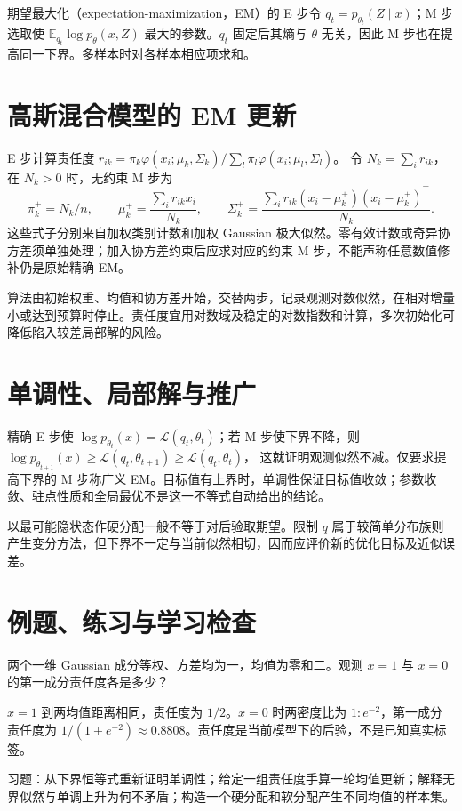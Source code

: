 期望最大化（expectation-maximization，EM）的 E 步令 $q_t=p_{\theta_t}(Z\mid x)$；M 步选取使 $\mathbb E_{q_t}\log p_\theta(x,Z)$ 最大的参数。$q_t$ 固定后其熵与 $\theta$ 无关，因此 M 步也在提高同一下界。多样本时对各样本相应项求和。

\section{高斯混合模型的 EM 更新}

E 步计算责任度
$r_{ik}=\pi_k\varphi(x_i;\mu_k,\Sigma_k)/\sum_l\pi_l\varphi(x_i;\mu_l,\Sigma_l)$。
令 $N_k=\sum_i r_{ik}$，在 $N_k>0$ 时，无约束 M 步为
\begin{equation}
 \pi_k^+=N_k/n,\qquad
 \mu_k^+=\frac{\sum_ir_{ik}x_i}{N_k},\qquad
 \Sigma_k^+=\frac{\sum_ir_{ik}(x_i-\mu_k^+)(x_i-\mu_k^+)^\top}{N_k}.
 \label{eq:ml-gmm-mstep}
\end{equation}
这些式子分别来自加权类别计数和加权 Gaussian 极大似然。零有效计数或奇异协方差须单独处理；加入协方差约束后应求对应的约束 M 步，不能声称任意数值修补仍是原始精确 EM。

算法由初始权重、均值和协方差开始，交替两步，记录观测对数似然，在相对增量小或达到预算时停止。责任度宜用对数域及稳定的对数指数和计算，多次初始化可降低陷入较差局部解的风险。

\section{单调性、局部解与推广}

精确 E 步使 $\log p_{\theta_t}(x)=\mathcal L(q_t,\theta_t)$；若 M 步使下界不降，则
$\log p_{\theta_{t+1}}(x)\geq\mathcal L(q_t,\theta_{t+1})\geq\mathcal L(q_t,\theta_t)$，
这就证明观测似然不减。仅要求提高下界的 M 步称广义 EM。目标值有上界时，单调性保证目标值收敛；参数收敛、驻点性质和全局最优不是这一不等式自动给出的结论。

以最可能隐状态作硬分配一般不等于对后验取期望。限制 $q$ 属于较简单分布族则产生变分方法，但下界不一定与当前似然相切，因而应评价新的优化目标及近似误差。

\section{例题、练习与学习检查}

\begin{example}[软责任度]
两个一维 Gaussian 成分等权、方差均为一，均值为零和二。观测 $x=1$ 与 $x=0$ 的第一成分责任度各是多少？
\end{example}
\begin{solve}
$x=1$ 到两均值距离相同，责任度为 $1/2$。$x=0$ 时两密度比为 $1:e^{-2}$，第一成分责任度为 $1/(1+e^{-2})\approx0.8808$。责任度是当前模型下的后验，不是已知真实标签。
\end{solve}

习题：从下界恒等式重新证明单调性；给定一组责任度手算一轮均值更新；解释无界似然与单调上升为何不矛盾；构造一个硬分配和软分配产生不同均值的样本集。




